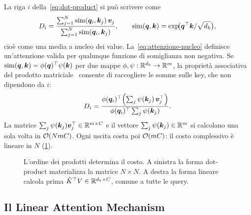 La riga $i$ della~\eqref{eq:dot-product} si può scrivere come
\begin{equation}
  D_i=\frac{\sum_{j=1}^{N}\mathrm{sim}(\bm{q}_i,\bm{k}_j)\,\bm{v}_j}
           {\sum_{j=1}^{N}\mathrm{sim}(\bm{q}_i,\bm{k}_j)},
  \qquad \mathrm{sim}(\bm{q},\bm{k})=\exp\!\bigl(\bm{q}^{\top}\bm{k}/\sqrt{d_k}\bigr),
  \label{eq:attenzione-nucleo}
\end{equation}
cioè come una media a nucleo dei value. La~\eqref{eq:attenzione-nucleo} definisce
un'attenzione valida per qualunque funzione di somiglianza non negativa. Se
$\mathrm{sim}(\bm{q},\bm{k})=\phi(\bm{q})^{\top}\psi(\bm{k})$ per due mappe
$\phi,\psi:\mathbb{R}^{d_k}\to\mathbb{R}^{m}$, la proprietà associativa del prodotto
matriciale~\cite{katharopoulos2020linear} consente di raccogliere le somme sulle key, che non
dipendono da $i$:
\begin{equation}
  D_i=\frac{\phi(\bm{q}_i)^{\top}\Bigl(\sum_{j}\psi(\bm{k}_j)\,\bm{v}_j^{\top}\Bigr)}
           {\phi(\bm{q}_i)^{\top}\sum_{j}\psi(\bm{k}_j)} .
  \label{eq:attenzione-lineare-generale}
\end{equation}
La matrice $\sum_j\psi(\bm{k}_j)\bm{v}_j^{\top}\in\mathbb{R}^{m\times C}$ e il vettore
$\sum_j\psi(\bm{k}_j)\in\mathbb{R}^{m}$ si calcolano una sola volta in $\mathcal{O}\!\left(NmC\right)$. Ogni uscita
costa poi $\mathcal{O}\!\left(mC\right)$: il costo complessivo è lineare in $N$ (\cref{fig:associativita}).

\begin{figure}[t]
  \centering
  \resizebox{0.92\linewidth}{!}{}
  \caption[Ordine dei prodotti nell'attenzione]{L'ordine dei prodotti determina il costo. A
    sinistra la forma dot-product materializza la matrice $N\times N$. A destra la forma lineare
    calcola prima $\hat K^{\top} V\in\mathbb{R}^{d_k\times C}$, comune a tutte le query.}
  \label{fig:associativita}
\end{figure}

\subsection{Il Linear Attention Mechanism}
\label{sec:attenzione-lineare}

